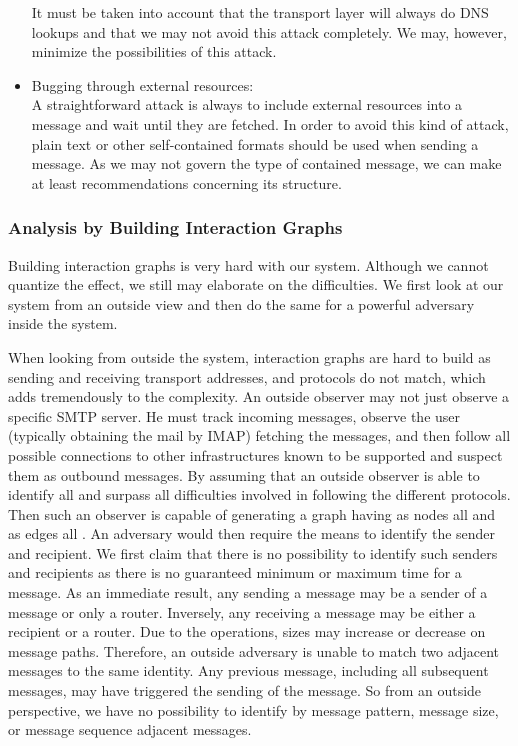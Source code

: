 \begin{itemize}
	It must be taken into account that the transport layer will always do DNS lookups and that we may not avoid this attack completely. We may, however, minimize the possibilities of this attack.
	
	\item Bugging through external resources:\\
	A straightforward attack is always to include external resources into a message and wait until they are fetched. In order to avoid this kind of attack, plain text or other self-contained formats should be used when sending a message. As we may not govern the type of contained message, we can make at least recommendations concerning its structure.
\end{itemize}

\subsubsection{Analysis by Building Interaction Graphs\label{sec:analysisInteractionGraphs}}
Building interaction graphs is very hard with our system. Although we cannot quantize the effect, we still may elaborate on the difficulties. We first look at our system from an outside view and then do the same for a powerful adversary inside the system.

When looking from outside the system, interaction graphs are hard to build as sending and receiving transport addresses, and protocols do not match, which adds tremendously to the complexity. An outside observer may not just observe a specific SMTP server. He must track incoming messages, observe the user (typically obtaining the mail by IMAP) fetching the messages, and then follow all possible connections to other infrastructures known to be supported and suspect them as outbound messages. By assuming that an outside observer is able to identify all \VortexMessages{} and surpass all difficulties involved in following the different protocols. Then such an observer is capable of generating a graph having as nodes all \VortexNodes{} and as edges all \VortexMessages{}. An adversary would then require the means to identify the sender and recipient. We first claim that there is no possibility to identify such senders and recipients as there is no guaranteed minimum or maximum time for a message. As an immediate result, any \VortexNode{} sending a message may be a sender of a message or only a router. Inversely, any \VortexNode{} receiving a message may be either a recipient or a router. Due to the operations, sizes may increase or decrease on message paths. Therefore, an outside adversary is unable to match two adjacent messages to the same identity. Any previous message, including all subsequent messages, may have triggered the sending of the message. So from an outside perspective, we have no possibility to identify by message pattern, message size, or message sequence adjacent messages.

